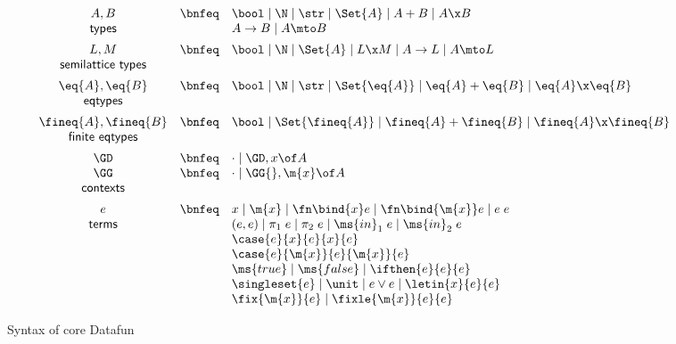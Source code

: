 \begin{figure}
  \[\begin{array}{ccl}
    A, B     &\bnfeq& \bool \pipe \N \pipe \str \pipe \Set{A}
    \pipe A + B \pipe A \x B\\
    \textsf{types} && A \uto B \pipe A \mto B
    \vspace{0.5em}\\
    L, M         &\bnfeq& \bool \pipe \N \pipe \Set{A}
    \pipe L \x M \pipe A \uto L \pipe A \mto L\\
    \textsf{semilattice types}
    \vspace{0.5em}\\
    \eq{A}, \eq{B} &\bnfeq& \bool \pipe \N \pipe \str \pipe \Set{\eq{A}}
    \pipe \eq{A} + \eq{B} \pipe \eq{A} \x \eq{B}\\
    \textsf{eqtypes} &&
    \vspace{0.5em}\\
    \fineq{A},\fineq{B}
    &\bnfeq& \bool \pipe \Set{\fineq{A}}
             \pipe \fineq{A} + \fineq{B} \pipe \fineq{A} \x \fineq{B}\\
    \textsf{finite eqtypes}
    \vspace{0.5em}\\
    \GD &\bnfeq& \cdot \pipe \GD, x\of A\\
    \GG &\bnfeq& \cdot \pipe \GG{},\m{x}\of A\\
    \textsf{contexts}
    \vspace{0.5em}\\
    e &\bnfeq& x \pipe \m{x} %
    \pipe \fn\bind{x} e \pipe \fn\bind{\m{x}} e
    \pipe e\;e\\
    \textsf{terms}
    && (e,e) \pipe \pi_1\;e \pipe \pi_2\;e
    \pipe \ms{in}_1\;e \pipe \ms{in}_2\;e\\
    && \case{e}{x}{e}{x}{e}\\
    && \case{e}{\m{x}}{e}{\m{x}}{e}\\
    && \ms{true} \pipe \ms{false} \pipe \ifthen{e}{e}{e}\\
    && \singleset{e} \pipe \unit \pipe e \vee e \pipe \letin{x}{e}{e}\\
    && \fix{\m{x}}{e} \pipe \fixle{\m{x}}{e}{e}
  \end{array}\]


  \caption{Syntax of core Datafun}
  \label{fig:syntax}
\end{figure}

